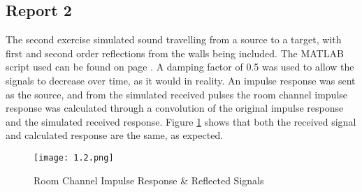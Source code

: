 \subsection*{Report 2}

	The second exercise simulated sound travelling from a source to a target, with first and second order reflections from the walls being included. The MATLAB script used can be found on page \pageref{matlab_1.2}. A damping factor of 0.5 was used to allow the signals to decrease over time, as it would in reality. An impulse response was sent as the source, and from the simulated received pulses the room channel impulse response was calculated through a convolution of the original impulse response and the simulated received response. Figure \ref{figure:1_2} shows that both the received signal and calculated response are the same, as expected.
	
	\begin{figure}[H] 
		\centering
		\texttt{[image: 1.2.png]}
		\caption{Room Channel Impulse Response \& Reflected Signals}
		\label{figure:1_2}
	\end{figure}